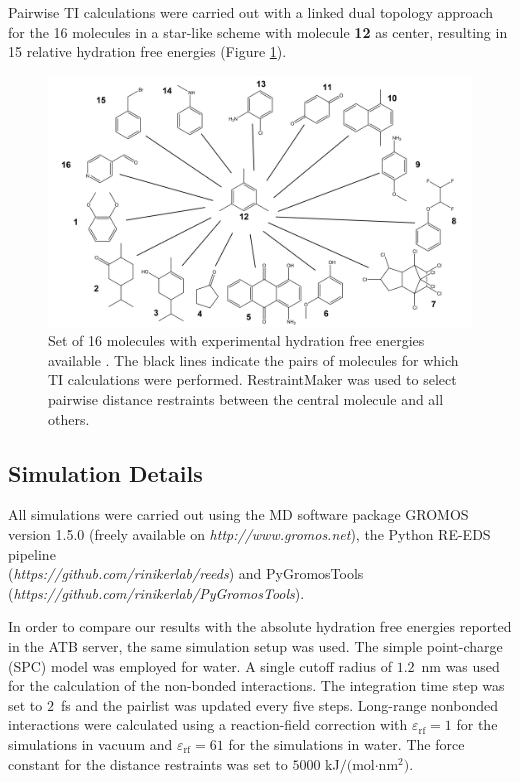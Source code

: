 Pairwise TI calculations were carried out with a linked dual topology approach for the 16 molecules in a star-like scheme with molecule \textbf{12} as center, resulting in 15 relative hydration free energies (Figure \ref{fig: Pairwise_TI_M030_Graph}).
\begin{figure}[h]
    \centering
    \includegraphics[width=\textwidth]{fig/methods/StateGraph_TI_2D_enumerated.png}
    \caption{Set of 16 molecules with experimental hydration free energies available \cite{Stroet2018,Wolfenden1987,Rizzo2006,Nicholls2008,Guthrie2009,Guthrie2014,Mobley2014}. The black lines indicate the pairs of molecules for which TI calculations were performed. RestraintMaker was used to select pairwise distance restraints between the central molecule and all others.} 
    \label{fig: Pairwise_TI_M030_Graph}
\end{figure}

\subsection{Simulation Details}
All simulations were carried out using the MD software package GROMOS\cite{Schmid2012} version 1.5.0 (freely available on \textit{http://www.gromos.net}),\cite{Ries2021B} the Python RE-EDS pipeline\\ (\textit{https://github.com/rinikerlab/reeds}) 
and PyGromosTools\cite{Lehner2021}\\ (\textit{https://github.com/rinikerlab/PyGromosTools}). 

In order to compare our results with the absolute hydration free energies reported in the ATB server,\cite{Stroet2018} the same simulation setup was used.
The simple point-charge (SPC) model\cite{Berendsen1981} was employed for water. A single cutoff radius of $1.2$~nm was used for the calculation of the non-bonded interactions. The integration time step was set to $2$~fs and the pairlist was updated every five steps. Long-range nonbonded interactions were calculated using a reaction-field correction\cite{Tironi1995} with $\varepsilon_{\text{rf}}=1$ for the simulations in vacuum and $\varepsilon_{\text{rf}}=61$ for the simulations in water.\cite{Heinz2001} The force constant for the distance restraints was set to $5000$ kJ$/($mol$\cdot$nm$^2)$.

